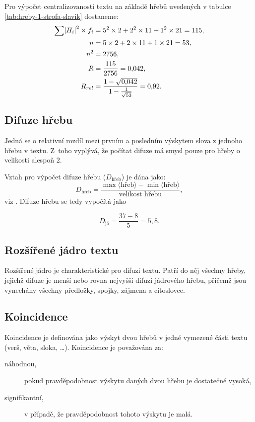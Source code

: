\documentclass[dp.tex]{subfiles}
\begin{document}
Pro výpočet centralizovanosti textu na základě hřebů uvedených v tabulce \ref{tab:hreby-1-strofa-slavik} dostaneme:
\begin{equation}
\begin{aligned}
\sum{ \abs{H_i}^2 \times f_i} &= 5^2 \times 2 + 2^2 \times 11 + 1^2 \times 21 = 115,\\
n &=  5 \times 2 + 2 \times 11 + 1 \times 21 = 53,\\
n^2 &= 2756,\\
R &=\frac{115}{2756} = 0{,}042,\\
R_{rel} &= \frac{1-\sqrt{0{,}042}}{1-\frac{1}{\sqrt{53}}} = 0{,}92.
\end{aligned}
\end{equation}
\subsection{Difuze hřebu}
Jedná se o relativní rozdíl mezi prvním a posledním výskytem slova z jednoho hřebu v textu. Z~toho vyplývá, že počítat difuze má smysl pouze pro hřeby o velikosti alespoň $2$.

Vztah pro výpočet difuze hřebu ($D_{\text{hřeb}}$) je dána jako:
\begin{equation}
D_\text{hřeb}=\frac{\max{\langle\text{hřeb}\rangle}-\min{\langle\text{hřeb}\rangle}}{\text{velikost hřebu}},
\end{equation}
viz \cite[str. 304]{Wimmer2003}. Difuze hřebu  se tedy vypočítá jako

\begin{equation}
D_\text{já}=\frac{37 - 8}{5} = 5{,}8.
\end{equation}\textbf{}


\subsection{Rozšířené jádro textu}
Rozšířené jádro je charakteristické pro difuzi textu. Patří do něj všechny hřeby, jejichž difuze je menší nebo rovna nejvyšší difuzi jádrového hřebu, přičemž jsou vynechány všechny předložky, spojky, zájmena a citoslovce.

\subsection{Koincidence}
Koincidence je definována jako výskyt dvou hřebů v jedné vymezené části textu (verš, věta, sloka, \ldots). Koincidence je považována za:
\begin{description}
\item[náhodnou,] pokud pravděpodobnost výskytu daných dvou hřebu je dostatečně vysoká,
\item[signifikantní,] v případě, že pravděpodobnost tohoto výskytu je malá.
\end{description}
\end{document}

